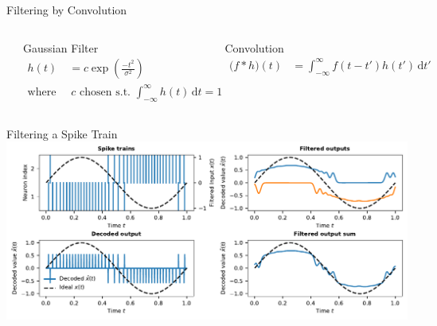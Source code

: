 \documentclass[handout,aspectratio=169]{beamer}
\begin{document}
\begin{frame}{Filtering by Convolution}
	\begin{columns}
		\includegraphics[width=\textwidth]{media/gaussian_filters.pdf}
		\begin{block}{Gaussian Filter}
			\begin{align*}
				h(t) &= c \exp \left( \frac{-t^2}{\sigma^2} \right) \\
				\text{where }  &~c \text{ chosen s.t. } {\textstyle \int_{-\infty}^\infty h(t) \,\mathrm{d}t = 1}
			\end{align*}
		\end{block}
		\begin{block}{Convolution}
			\begin{align*}
				\big( f \ast h \big)(t) &= \int_{-\infty}^{\infty} f(t - t') h(t') \,\mathrm{d}t'
			\end{align*}
		\end{block}
	\end{columns}
\end{frame}

\begin{frame}{Filtering a Spike Train}
	\includegraphics[width=\textwidth]{media/two_neurons_filtered.pdf}
\end{frame}
\end{document}
